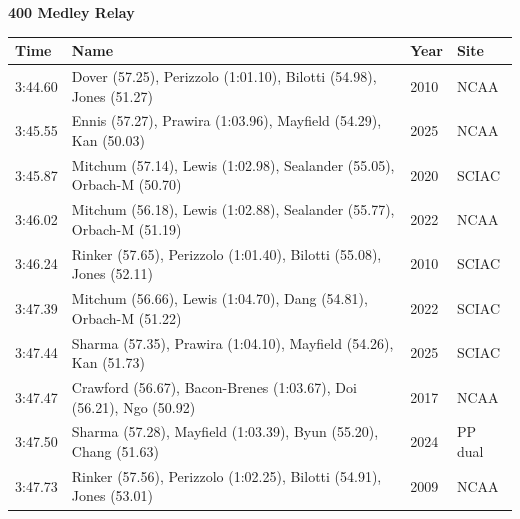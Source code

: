 \noindent\begin{minipage}[t]{0.98\textwidth}
\centering
\textbf{\textcolor{teamprimary}{400 Medley Relay}}\par
\vspace{0.5em}
\centering
\small
\renewcommand{\arraystretch}{1.0}
\setlength{\tabcolsep}{4pt}
\begin{tabular}{@{}p{2.7cm}p{4.3cm}p{1.6cm}p{2.7cm}@{}}
\toprule
\textbf{Time} & \textbf{Name} & \textbf{Year} & \textbf{Site} \\
\midrule
3:44.60 & Dover (57.25), Perizzolo (1:01.10), Bilotti (54.98), Jones (51.27) & 2010 & NCAA \\
3:45.55 & Ennis (57.27), Prawira (1:03.96), Mayfield (54.29), Kan (50.03) & 2025 & NCAA \\
3:45.87 & Mitchum (57.14), Lewis (1:02.98), Sealander (55.05), Orbach-M (50.70) & 2020 & SCIAC \\
3:46.02 & Mitchum (56.18), Lewis (1:02.88), Sealander (55.77), Orbach-M (51.19) & 2022 & NCAA \\
3:46.24 & Rinker (57.65), Perizzolo (1:01.40), Bilotti (55.08), Jones (52.11) & 2010 & SCIAC \\
3:47.39 & Mitchum (56.66), Lewis (1:04.70), Dang (54.81), Orbach-M (51.22) & 2022 & SCIAC \\
3:47.44 & Sharma (57.35), Prawira (1:04.10), Mayfield (54.26), Kan (51.73) & 2025 & SCIAC \\
3:47.47 & Crawford (56.67), Bacon-Brenes (1:03.67), Doi (56.21), Ngo (50.92) & 2017 & NCAA \\
3:47.50 & Sharma (57.28), Mayfield (1:03.39), Byun (55.20), Chang (51.63) & 2024 & PP dual \\
3:47.73 & Rinker (57.56), Perizzolo (1:02.25), Bilotti (54.91), Jones (53.01) & 2009 & NCAA \\
\bottomrule
\end{tabular}
\end{minipage}
\clearpage
